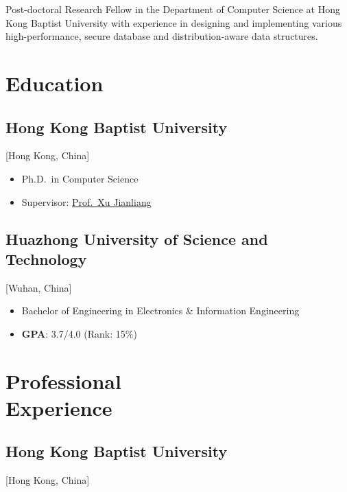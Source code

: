 \documentclass{mycv}
\begin{document}
\maketitle%

\begin{summary}
Post-doctoral Research Fellow in the Department of Computer Science at Hong Kong Baptist University with experience in designing and implementing various high-performance, secure database and distribution-aware data structures.
\end{summary}

\section{Education}

\subsection{Hong Kong Baptist University}[Hong Kong, China]
\vspace{-\parskip}%
\begin{itemize}[label={}]
  \item Ph.D.\ in Computer Science 
  \item Supervisor: \href{https://www.comp.hkbu.edu.hk/~xujl}{Prof.~Xu Jianliang}
\end{itemize}

\subsection{Huazhong University of Science and Technology}[Wuhan, China]
\vspace{-\parskip}%
\begin{itemize}[label={}]
  \item Bachelor of Engineering in Electronics \& Information Engineering 
  \item \textbf{GPA}: 3.7/4.0 (Rank: 15\%)
\end{itemize}

\section{Professional \\ Experience}

\subsection{Hong Kong Baptist University}[Hong Kong, China]
\begin{positions}
\end{positions}
\end{document}
